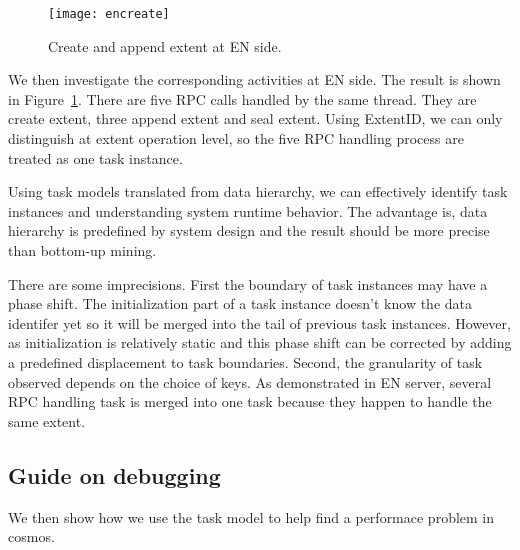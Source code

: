 \begin{figure}
\centering
\texttt{[image: encreate]}
\caption{Create and append extent at EN side.}
\label{fig:encreate}
\end{figure}

We then investigate the corresponding activities at EN side.
The result is shown in Figure~\ref{fig:encreate}. There
are five RPC calls handled by the same thread. They are
create extent, three append extent and seal extent. Using
ExtentID, we can only distinguish at extent operation level,
so the five RPC handling process are treated as one task
instance.

\lesson Using task models translated from data hierarchy, we
can effectively identify task instances and understanding
system runtime behavior. The advantage is, data
hierarchy is predefined by system design and the result
should be more precise than bottom-up mining.



There are some imprecisions. First the boundary of task
instances may have a phase shift. The initialization part of
a task instance doesn't know the data identifer yet so it
will be merged into the tail of previous task instances.
However, as initialization is relatively static and this
phase shift can be corrected by adding a predefined
displacement to task boundaries. Second, the granularity of
task observed depends on the choice of keys.  As
demonstrated in EN server, several RPC handling task is
merged into one task because they happen to handle the
same extent.

\subsection{Guide on debugging}

We then show how we use the task model to help find a
performace problem in cosmos.

